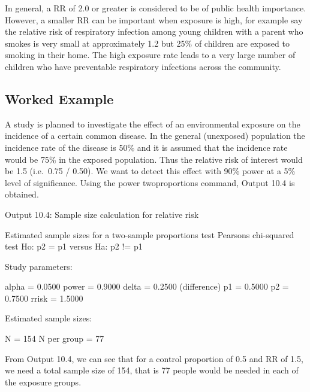 \documentclass[
]{memoir}
\newenvironment{Shaded}{\begin{snugshade}}{\end{snugshade}}
\newcommand{\NormalTok}[1]{#1}
\begin{document}
In general, a RR of 2.0 or greater is considered to be of public health importance. However, a smaller RR can be important when exposure is high, for example say the relative risk of respiratory infection among young children with a parent who smokes is very small at approximately 1.2 but 25\% of children are exposed to smoking in their home. The high exposure rate leads to a very large number of children who have preventable respiratory infections across the community.

\hypertarget{worked-example-17}{%
\subsection{Worked Example}\label{worked-example-17}}

A study is planned to investigate the effect of an environmental exposure on the incidence of a certain common disease. In the general (unexposed) population the incidence rate of the disease is 50\% and it is assumed that the incidence rate would be 75\% in the exposed population. Thus the relative risk of interest would be 1.5 (i.e.~0.75 / 0.50). We want to detect this effect with 90\% power at a 5\% level of significance. Using the power twoproportions command, Output 10.4 is obtained.

Output 10.4: Sample size calculation for relative risk

\begin{Shaded}
\begin{Highlighting}[]
\NormalTok{Estimated sample sizes for a two{-}sample proportions test}
\NormalTok{Pearson\textquotesingle{}s chi{-}squared test }
\NormalTok{Ho: p2 = p1  versus  Ha: p2 != p1}

\NormalTok{Study parameters:}

\NormalTok{        alpha =    0.0500}
\NormalTok{        power =    0.9000}
\NormalTok{        delta =    0.2500  (difference)}
\NormalTok{           p1 =    0.5000}
\NormalTok{           p2 =    0.7500}
\NormalTok{        rrisk =    1.5000}

\NormalTok{Estimated sample sizes:}

\NormalTok{            N =       154}
\NormalTok{  N per group =        77}
\end{Highlighting}
\end{Shaded}

From Output 10.4, we can see that for a control proportion of 0.5 and RR of 1.5, we need a total sample size of 154, that is 77 people would be needed in each of the exposure groups.
\end{document}
